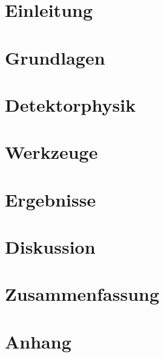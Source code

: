 \documentclass[bachelor,       %
               twoside,        %
               BCOR10mm,       %
              english,ngerman, %
               ]{GAUBM}
\begin{document}
\mainmatter   %

\chapter{Einleitung}

\chapter{\lhc}

\chapter{Grundlagen}

\chapter{Detektorphysik}

\chapter{Werkzeuge}

\chapter{Ergebnisse}
\chapter{Diskussion}
\chapter{Zusammenfassung}

\appendix
\chapter{Anhang}


\cleardoublepage
 


\end{document}
